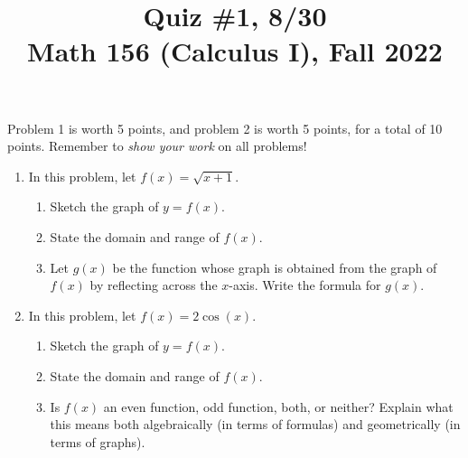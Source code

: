\documentclass[11pt]{article}
\title{Quiz \#1, 8/30 \\ Math 156 (Calculus I), Fall 2022}
\date{}
\begin{document}
\maketitle

\thispagestyle{empty}

\vspace{-1cm}

Problem 1 is worth 5 points, and problem 2 is worth 5 points, for a total of 10 points. Remember to \emph{show your work} on all problems!

\begin{enumerate}
\item In this problem, let $f(x) = \sqrt{x+1}$.
\begin{enumerate}
\item Sketch the graph of $y=f(x)$.
\item State the domain and range of $f(x)$.
\item Let $g(x)$ be the function whose graph is obtained from the graph of $f(x)$ by reflecting across the $x$-axis. Write the formula for $g(x)$.
\end{enumerate}

\vspace{5cm}

\item In this problem, let $f(x) = 2\cos(x)$.
\begin{enumerate}
\item Sketch the graph of $y=f(x)$.
\item State the domain and range of $f(x)$.
\item Is $f(x)$ an even function, odd function, both, or neither? Explain what this means both algebraically (in terms of formulas) and geometrically (in terms of graphs).
\end{enumerate}

\end{enumerate}
\end{document}
